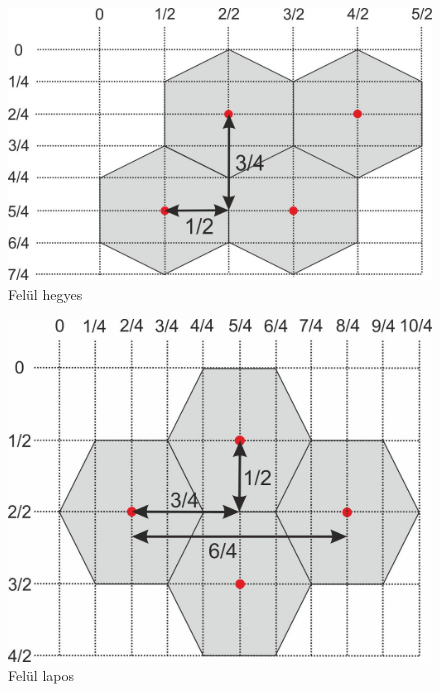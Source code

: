 \begin{figure}[h!]
\centering
\includegraphics[scale=1.2]{kepek/PointyTop.jpg}
\caption{Felül hegyes}
\label{fig:PointyTop}
\end{figure}

\begin{figure}[h!]
\centering
\includegraphics[scale=1.2]{kepek/FlatTop.jpg}
\caption{Felül lapos}
\label{fig:FlatTop}
\end{figure}
